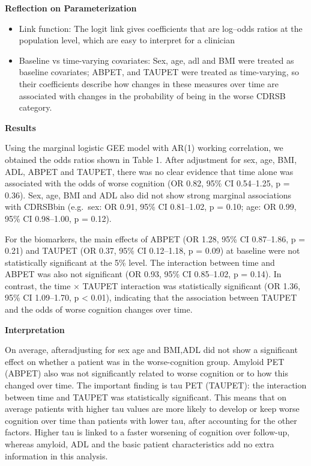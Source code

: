 \documentclass[
  11pt,
  letterpaper,
  DIV=11,
  numbers=noendperiod]{scrartcl}
\providecommand{\tightlist}{%
  \setlength{\itemsep}{0pt}\setlength{\parskip}{0pt}}\usepackage{longtable,booktabs,array}
\begin{document}
\textbf{Reflection on Parameterization}

\begin{itemize}
\tightlist
\item
  Link function: The logit link gives coefficients that are log--odds
  ratios at the population level, which are easy to interpret for a
  clinician
\item
  Baseline vs time-varying covariates: Sex, age, adl and BMI were
  treated as baseline covariates; ABPET, and TAUPET were treated as
  time-varying, so their coefficients describe how changes in these
  measures over time are associated with changes in the probability of
  being in the worse CDRSB category.
\end{itemize}

\textbf{Results}

Using the marginal logistic GEE model with AR(1) working correlation, we
obtained the odds ratios shown in Table 1. After adjustment for sex,
age, BMI, ADL, ABPET and TAUPET, there was no clear evidence that time
alone was associated with the odds of worse cognition (OR 0.82, 95\% CI
0.54--1.25, p = 0.36). Sex, age, BMI and ADL also did not show strong
marginal associations with CDRSBbin (e.g.~sex: OR 0.91, 95\% CI
0.81--1.02, p = 0.10; age: OR 0.99, 95\% CI 0.98--1.00, p = 0.12).

For the biomarkers, the main effects of ABPET (OR 1.28, 95\% CI
0.87--1.86, p = 0.21) and TAUPET (OR 0.37, 95\% CI 0.12--1.18, p = 0.09)
at baseline were not statistically significant at the 5\% level. The
interaction between time and ABPET was also not significant (OR 0.93,
95\% CI 0.85--1.02, p = 0.14). In contrast, the time × TAUPET
interaction was statistically significant (OR 1.36, 95\% CI 1.09--1.70,
p \textless{} 0.01), indicating that the association between TAUPET and
the odds of worse cognition changes over time.

\textbf{Interpretation}

On average, afteradjusting for sex age and BMI,ADL did not show a
significant effect on whether a patient was in the worse-cognition
group. Amyloid PET (ABPET) also was not significantly related to worse
cognition or to how this changed over time. The important finding is tau
PET (TAUPET): the interaction between time and TAUPET was statistically
significant. This means that on average patients with higher tau values
are more likely to develop or keep worse cognition over time than
patients with lower tau, after accounting for the other factors. Higher
tau is linked to a faster worsening of cognition over follow-up, whereas
amyloid, ADL and the basic patient characteristics add no extra
information in this analysis.
\end{document}
